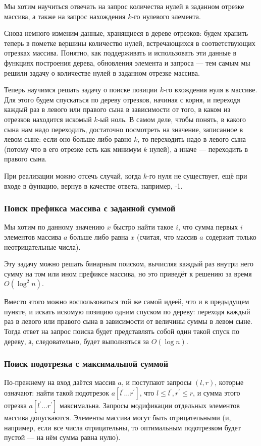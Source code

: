 Мы хотим научиться отвечать на запрос количества нулей в заданном отрезке массива, а также на запрос нахождения $k$-го нулевого элемента.

Снова немного изменим данные, хранящиеся в дереве отрезков: будем хранить теперь в пометке вершины количество нулей, встречающихся в соответствующих отрезках массива. Понятно, как поддерживать и использовать эти данные в функциях построения дерева, обновления элемента и запроса — тем самым мы решили задачу о количестве нулей в заданном отрезке массива.

Теперь научимся решать задачу о поиске позиции $k$-го вхождения нуля в массиве. Для этого будем спускаться по дереву отрезков, начиная с корня, и переходя каждый раз в левого или правого сына в зависимости от того, в каком из отрезков находится искомый $k$-ый ноль. В самом деле, чтобы понять, в какого сына нам надо переходить, достаточно посмотреть на значение, записанное в левом сыне: если оно больше либо равно $k$, то переходить надо в левого сына (потому что в его отрезке есть как минимум $k$ нулей), а иначе — переходить в правого сына.

При реализации можно отсечь случай, когда $k$-го нуля не существует, ещё при входе в функцию, вернув в качестве ответа, например, -1.

\subsubsection{Поиск префикса массива с заданной суммой}
Мы хотим по данному значению $x$ быстро найти такое $i$, что сумма первых $i$ элементов массива $a$ больше либо равна $x$ (считая, что массив $a$ содержит только неотрицательные числа).

Эту задачу можно решать бинарным поиском, вычисляя каждый раз внутри него сумму на том или ином префиксе массива, но это приведёт к решению за время $O (\log^2 n)$.

Вместо этого можно воспользоваться той же самой идеей, что и в предыдущем пункте, и искать искомую позицию одним спуском по дереву: переходя каждый раз в левого или правого сына в зависимости от величины суммы в левом сыне. Тогда ответ на запрос поиска будет представлять собой один такой спуск по дереву, а, следовательно, будет выполняться за $O (\log n)$.

\subsubsection{Поиск подотрезка с максимальной суммой}
По-прежнему на вход даётся массив $a$, и поступают запросы $(l,r)$, которые означают: найти такой подотрезок $a[l^\prime \ldots r^\prime]$, что $l \le l^\prime, r^\prime \le r$, и сумма этого отрезка $a[l^\prime \ldots r^\prime]$ максимальна. Запросы модификации отдельных элементов массива допускаются. Элементы массива могут быть отрицательными (и, например, если все числа отрицательны, то оптимальным подотрезком будет пустой — на нём сумма равна нулю).

